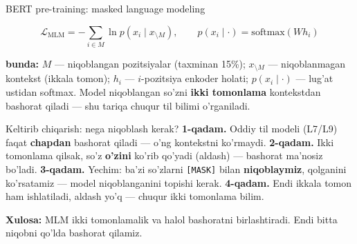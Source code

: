\documentclass[aspectratio=169,11pt]{beamer}
\newcommand{\bunda}[1]{{\small\textbf{bunda:}\; #1}}
\begin{document}
\begin{frame}{BERT pre-training: masked language modeling}
  \begin{tcolorbox}[defbox,title={Ta'rif: MLM (niqoblangan til modeli)}]
    \vspace{-0.4em}
    $$ \mathcal{L}_{\mathrm{MLM}} = -\!\!\sum_{i\in M}\ln p(x_i \mid x_{\setminus M}), \qquad
       p(x_i \mid \cdot) = \mathrm{softmax}(W h_i) $$
  \end{tcolorbox}
  \vspace{2pt}
  \bunda{$M$ --- niqoblangan pozitsiyalar (taxminan 15\%); $x_{\setminus M}$ ---
  niqoblanmagan kontekst (ikkala tomon); $h_i$ --- $i$-pozitsiya enkoder holati;
  $p(x_i\mid\cdot)$ --- lug'at ustidan softmax.}
  \vspace{4pt}
  \footnotesize Model niqoblangan so'zni \textbf{ikki tomonlama} kontekstdan
  bashorat qiladi --- shu tariqa chuqur til bilimi o'rganiladi.
\end{frame}

\begin{frame}{Keltirib chiqarish: nega niqoblash kerak?}
  \textbf{1-qadam.} Oddiy til modeli (L7/L9) faqat \textbf{chapdan} bashorat
  qiladi --- o'ng kontekstni ko'rmaydi.
  \pause
  \textbf{2-qadam.} Ikki tomonlama qilsak, so'z \textbf{o'zini} ko'rib qo'yadi
  (aldash) --- bashorat ma'nosiz bo'ladi.
  \pause
  \textbf{3-qadam.} Yechim: ba'zi so'zlarni \texttt{[MASK]} bilan \textbf{niqoblaymiz},
  qolganini ko'rsatamiz --- model niqoblanganini topishi kerak.
  \pause
  \textbf{4-qadam.} Endi ikkala tomon ham ishlatiladi, aldash yo'q --- chuqur
  ikki tomonlama bilim.
  \begin{tcolorbox}[okbox,top=2pt,bottom=2pt]
    \small \textbf{Xulosa:} MLM ikki tomonlamalik va halol bashoratni
    birlashtiradi. Endi bitta niqobni qo'lda bashorat qilamiz.
  \end{tcolorbox}
\end{frame}
\end{document}
